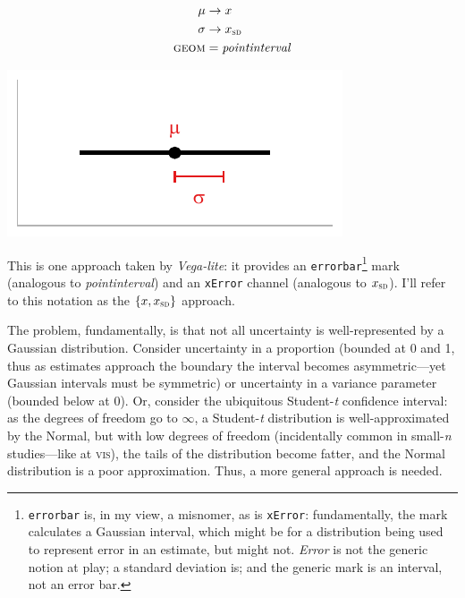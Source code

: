 \documentclass[journal]{vgtc}              %
\begin{document}
\noindent
\begin{minipage}{.5\columnwidth}
\begin{align*}
\mu &\rightarrow x\\
\sigma &\rightarrow x_\textsc{sd}\\
\textsc{geom} &= \mathit{pointinterval}
\end{align*}
  \end{minipage}%
  \begin{minipage}{.4\columnwidth}
    \centering
    \includegraphics[width=1.2\columnwidth]{figs/2-mean_sd_interval.pdf}
  \end{minipage}

This is one approach taken by \textit{Vega-lite}: it provides an \texttt{errorbar}\footnote{\label{foot:errorbar}\texttt{errorbar} is, in my view, a misnomer, as is \texttt{xError}: fundamentally, the mark calculates a Gaussian interval, which might be for a distribution being used to represent error in an estimate, but might not. \textit{Error} is not the generic notion at play; a standard deviation is; and the generic mark is an interval, not an error bar.} mark (analogous to \textit{pointinterval}) and an \texttt{xError}  channel (analogous to $x_\textsc{sd}$). I'll refer to this notation as the $\{x, x_\textsc{sd}\}$ approach.

The problem, fundamentally, is that not all uncertainty is well-represented by a Gaussian distribution. Consider uncertainty in a proportion (bounded at 0 and 1, thus as estimates approach the boundary the interval becomes asymmetric---yet Gaussian intervals must be symmetric) or uncertainty in a variance parameter (bounded below at 0). Or, consider the ubiquitous Student-\textit{t} confidence interval: as the degrees of freedom go to $\infty$, a Student-\textit{t} distribution is well-approximated by the Normal, but with low degrees of freedom (incidentally common in small-\textit{n} studies---like at \textsc{vis}), the tails of the distribution become fatter, and the Normal distribution is a poor approximation. Thus, a more general approach is needed.
\end{document}
